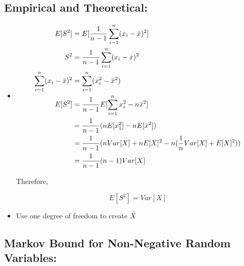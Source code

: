 \documentclass[11pt,letterpaper,titlepage]{article}
\begin{document}
\subsection{Empirical and Theoretical:}

\begin{itemize}
    
    \item 
    
    \begin{equation*}
        \begin{aligned}
            E[S^2] &= E[\frac{1}{n-1} \sum_{i=1}^{n} (x_i - \Bar{x})^2] \\
            S^2 &= \frac{1}{n-1} \sum_{i=1}^{n} (x_i - \Bar{x})^2 \\
            \sum_{i=1}^{n} (x_i - \Bar{x})^2 &=  \sum_{i=1}^{n} (x_i^2 - \Bar{x}^2) \\
            E[S^2] &= \frac{1}{n-1} E[\sum_{i=1}^{n} x_i^2 - n \Bar{x}^2] \\
            &= \frac{1}{n-1} (n E[x_1^2] - n E[\Bar{x}^2]) \\
            &= \frac{1}{n-1} (n Var[X] + n E[X]^2 - n (\frac{1}{n} Var[X] + E[X]^2)) \\
            &= \frac{1}{n-1} (n - 1) Var[X]
        \end{aligned}
    \end{equation*}
    
    Therefore,
    
    \begin{equation*}
        E[S^2] = Var[X]
    \end{equation*}
    
    \item Use one degree of freedom to create $\Bar{X}$
    
\end{itemize}

\subsection{Markov Bound for Non-Negative Random Variables:}
\end{document}
